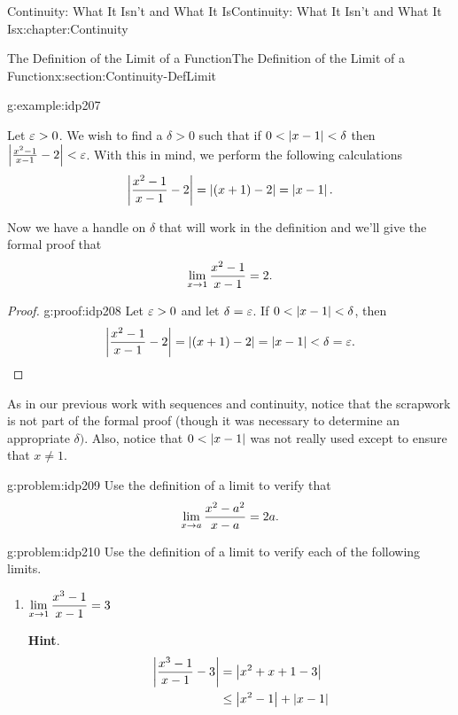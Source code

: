 \begin{chapterptx}{Continuity: What It Isn't and What It Is}{}{Continuity: What It Isn't and What It Is}{}{}{x:chapter:Continuity}
\begin{sectionptx}{The Definition of the Limit of a Function}{}{The Definition of the Limit of a Function}{}{}{x:section:Continuity-DefLimit}
\begin{example}{}{g:example:idp207}
			\par
			\par
			Let \(\varepsilon>0\).  We wish to find a \(\delta>0\) such that if \(0< \left|x-1\right|< \delta\) then \(\left|\frac{x^2-1}{x-1}-2\right|< \varepsilon\).  With this in mind, we perform the following calculations%
			\begin{equation*}
				\left|\frac{x^2-1}{x-1}-2\right|=\left|(x+1)-2\right| = \left|x-1\right|\text{.}
			\end{equation*}
			\par
			Now we have a handle on \(\delta\) that will work in the definition and we'll give the formal proof that%
			\begin{equation*}
				{\displaystyle\lim_{x\rightarrow 1}\frac{x^2-1}{x-1}}=2\text{.}
			\end{equation*}
		\end{example}
		\begin{proof}{}{g:proof:idp208}
			Let \(\varepsilon>0\) and let \(\delta=\varepsilon\). If \(0< \left|x-1\right|< \delta\), then%
			\begin{equation*}
				\left|\frac{x^2-1}{x-1}-2\right|=\left|(x+1)-2\right|=\left|x-1\right|< \delta=\varepsilon\text{.}\relax
			\end{equation*}
		\end{proof}
		As in our previous work with sequences and continuity, notice that the scrapwork is not part of the formal proof (though it was necessary to determine an appropriate \(\delta)\).  Also, notice that \(0< \left|x-1\right|\) was not really used except to ensure that \(x\neq 1\).%
		\begin{problem}{}{g:problem:idp209}%
			Use the definition of a limit to verify that%
			\begin{equation*}
				{\displaystyle\lim_{x\rightarrow a}\frac{x^2-a^2}{x-a}}=2a.{}
			\end{equation*}
		\end{problem}
		\begin{problem}{}{g:problem:idp210}%
			Use the definition of a limit to verify each of the following limits.%
			\begin{enumerate}[font=\bfseries,label=(\alph*),ref=\alph*]
				\item{}\({\displaystyle\lim_{x\rightarrow 1}\frac{x^3-1}{x-1}}=3\)%
				\par\smallskip%
				\noindent\textbf{\blocktitlefont Hint}.\hypertarget{g:hint:idp211}{}\quad{}%
				\begin{align*}
					\abs{\frac{x^3-1}{x-1}-3} \amp = \abs{x^2+x+1-3}\\
					\amp \leq\abs{x^2-1}+\abs{x-1}\\

\end{align*}
\end{enumerate}
\end{problem}
\end{sectionptx}
\end{chapterptx}
